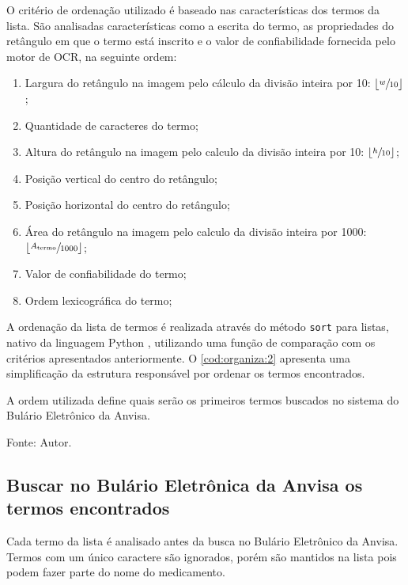 O critério de ordenação utilizado é baseado nas características dos termos da lista.
São analisadas características como a escrita do termo, as propriedades do retângulo em que o termo está inscrito e o valor de confiabilidade fornecida pelo motor de \ac{OCR}, na seguinte ordem:
\begin{enumerate}
    \item Largura do retângulo na imagem pelo cálculo da divisão inteira por 10: $\left\lfloor \sfrac{w}{10} \right\rfloor$;
    \item Quantidade de caracteres do termo;
    \item Altura do retângulo na imagem pelo calculo da divisão inteira por 10: $\left\lfloor \sfrac{h}{10} \right\rfloor$;
    \item Posição vertical do centro do retângulo;
    \item Posição horizontal do centro do retângulo;
    \item Área do retângulo  na imagem pelo calculo da divisão inteira por 1000: $\left\lfloor \sfrac{A_{\text{termo}}}{1000} \right\rfloor$;
    \item Valor de confiabilidade do termo;
    \item Ordem lexicográfica do termo;
\end{enumerate}

A ordenação da lista de termos é realizada através do método \lstinline|sort| para listas, nativo da linguagem Python \cite{pythonSorting}, utilizando uma função de comparação com os critérios apresentados anteriormente.
O \autoref{cod:organiza:2} apresenta uma simplificação da estrutura responsável por ordenar os termos encontrados.

A ordem utilizada define quais serão os primeiros termos buscados no sistema do Bulário Eletrônico da \ac{Anvisa}.

\begin{lstfloat}[htbp]
    \centering
    
    \caption*{Fonte: Autor.}
\end{lstfloat}

\subsection{Buscar no Bulário Eletrônica da \acs{Anvisa} os termos encontrados}\label{ssec:buscar}


Cada termo da lista é analisado antes da busca no Bulário Eletrônico da \ac{Anvisa}.
Termos com um único caractere são ignorados, porém são mantidos na lista pois podem fazer parte do nome do medicamento.


